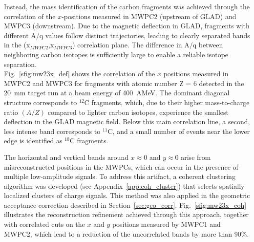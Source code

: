 Instead, the mass identification of the carbon fragments was achieved through the correlation of the $x$-positions measured in MWPC2 (upstream of GLAD) and MWPC3 (downstream). Due to the magnetic deflection in GLAD, fragments with different A/q values follow distinct trajectories, leading to clearly separated bands in the (x$_{MWPC2}$,x$_{MWPC3}$) correlation plane. The difference in A/q between neighboring carbon isotopes is sufficiently large to enable a reliable isotope separation.\\
Fig.~\ref{sfig:mw23x_def} shows the correlation of the $x$ positions measured in MWPC2 and MWPC3 for fragments with atomic number Z = 6 detected in the 20~mm target run at a beam energy of 400~AMeV. The dominant diagonal structure corresponds to $^{12}$C fragments, which, due to their higher mass-to-charge ratio $(A/Z)$ compared to lighter carbon isotopes, experience the smallest deflection in the GLAD magnetic field. Below this main correlation line, a second, less intense band corresponds to $^{11}$C, and a small number of events near the lower edge is identified as $^{10}$C fragments.

The horizontal and vertical bands around $x \approx 0$ and $y \approx 0$ arise from misreconstructed positions in the MWPCs, which can occur in the presence of multiple low-amplitude signals. To address this artifact, a coherent clustering algorithm was developed (see Appendix~\ref{app:coh_cluster}) that selects spatially localized clusters of charge signals. This method was also applied in the geometric acceptance correction described in Section~\ref{sec:geo_corr}. Fig.~\ref{sfig:mw23x_coh} illustrates the reconstruction refinement achieved through this approach, together with correlated cuts on the $x$  and $y$ positions measured by MWPC1 and MWPC2, which lead to a reduction of the uncorrelated bands by more than 90\%.

